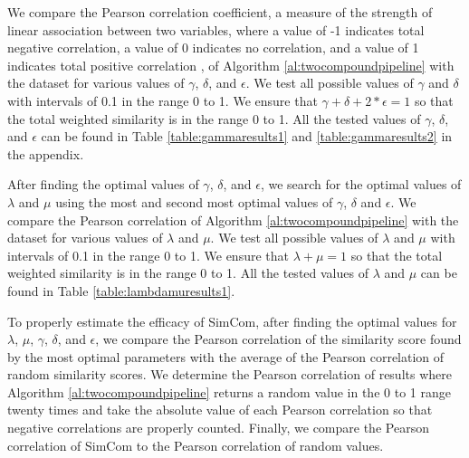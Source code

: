 \documentclass{article}
\begin{document}
We compare the Pearson correlation coefficient, a measure of the strength of linear association between two variables, where a value of -1 indicates total negative correlation, a value of 0 indicates no correlation, and a value of 1 indicates total positive correlation \cite{sedgwick2012pearson}, of Algorithm \ref{al:twocompoundpipeline} with the dataset for various values of $\gamma$, $\delta$, and $\epsilon$. We test all possible values of $\gamma$ and $\delta$ with intervals of 0.1 in the range 0 to 1. We ensure that $\gamma + \delta + 2 * \epsilon = 1$ so that the total weighted similarity is in the range 0 to 1. All the tested values of $\gamma$, $\delta$, and $\epsilon$ can be found in Table \ref{table:gammaresults1} and \ref{table:gammaresults2} in the appendix. 

After finding the optimal values of $\gamma$, $\delta$, and $\epsilon$, we search for the optimal values of $\lambda$ and $\mu$ using the most and second most optimal values of $\gamma$, $\delta$ and $\epsilon$. We   compare the Pearson correlation of Algorithm \ref{al:twocompoundpipeline} with the dataset for various values of $\lambda$ and $\mu$. We   test all possible values of $\lambda$ and $\mu$ with intervals of 0.1 in the range 0 to 1. We   ensure that $\lambda + \mu = 1$ so that the total weighted similarity is in the range 0 to 1. All the tested values of $\lambda$ and $\mu$ can be found in Table \ref{table:lambdamuresults1}.

To properly estimate the efficacy of SimCom, after finding the optimal values for $\lambda$, $\mu$, $\gamma$, $\delta$, and $\epsilon$, we   compare the Pearson correlation of the similarity score found by the most optimal parameters with the average of the Pearson correlation of random similarity scores. We   determine the Pearson correlation of results where Algorithm \ref{al:twocompoundpipeline} returns a random value in the 0 to 1 range twenty times and take the absolute value of each Pearson correlation so that negative correlations are properly counted. Finally, we   compare the Pearson correlation of SimCom to the Pearson correlation of random values.


\end{document}
